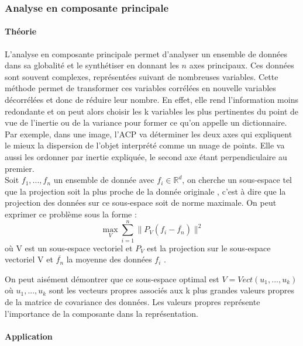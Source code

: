 \documentclass{article}
\begin{document}
\subsubsection{Analyse en composante principale}

\paragraph{Théorie} L'analyse en composante principale \cite{bib:PCA} permet d'analyser un ensemble de données dans sa globalité et le synthétiser en donnant les $n$ axes principaux. Ces données sont souvent complexes, représentées suivant de nombreuses variables. Cette méthode permet de transformer ces variables corrélées en nouvelle variables décorrélées et donc de réduire leur nombre. En effet, elle rend l'information moins redondante et on peut alors choisir les k variables les plus pertinentes du point de vue de l'inertie ou de la variance pour former ce qu'on appelle un dictionnaire. \\
Par exemple, dans une image, l'ACP va déterminer les deux axes qui expliquent le mieux la dispersion de l'objet interprété comme un nuage de points. Elle va aussi les ordonner par inertie expliquée, le second axe étant perpendiculaire au premier.\\

Soit $f_1,...,f_n$  un ensemble de donnée avec $f_i \in \mathbb{R}^d$, on cherche un sous-espace tel que la projection soit la plus proche de la donnée originale , c'est à dire que la projection des données sur ce sous-espace soit de norme maximale. On peut exprimer ce problème sous la forme :
$$\max_V \sum_{i=1}^n \parallel P_V(f_i-\overline{f_n}) \parallel ^2$$
où V est un sous-espace vectoriel et $P_V$ est la projection sur le sous-espace vectoriel V et $\overline{f_n}$ la moyenne des données $f_i$ .

On peut aisément démontrer que ce sous-espace optimal est $V=Vect(u_1,..., u_k)$ où $u_1,..., u_k$ sont les vecteurs propres associés aux k plus grandes valeurs propres de la matrice de covariance des données. Les valeurs propres représente l'importance de la composante dans la représentation.


\paragraph{Application}
\end{document}
